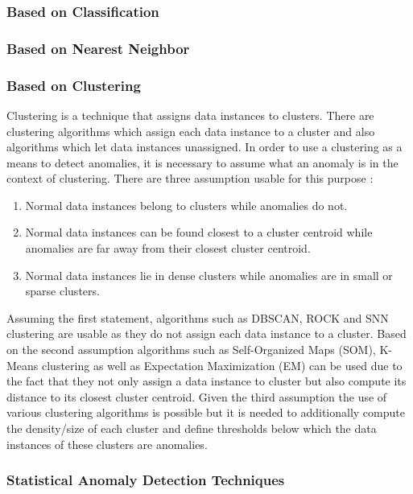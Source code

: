 \documentclass{dima}
\begin{document}
\subsubsection{Based on Classification}

\subsubsection{Based on Nearest Neighbor}

\subsubsection{Based on Clustering}
Clustering is a technique that assigns data instances to clusters. There are clustering algorithms which assign each data instance to a cluster and also algorithms which let data instances unassigned. In order to use a clustering as a means to detect anomalies, it is necessary to assume what an anomaly is in the context of clustering. There are three assumption usable for this purpose \cite{Chandola:2009:ADS:1541880.1541882}:
\begin{enumerate}
\item Normal data instances belong to clusters while anomalies do not.
\item Normal data instances can be found closest to a cluster centroid while anomalies are far away from their closest cluster centroid.
\item Normal data instances lie in dense clusters while anomalies are in small or sparse clusters.
\end{enumerate}
Assuming the first statement, algorithms such as DBSCAN, ROCK and SNN clustering are usable as they do not assign each data instance to a cluster. Based on the second assumption algorithms such as Self-Organized Maps (SOM), K-Means clustering as well as Expectation Maximization (EM) can be used due to the fact that they not only assign a data instance to cluster but also compute its distance to its closest cluster centroid. Given the third assumption the use of various clustering algorithms is possible but it is needed to additionally compute the density/size of each cluster and define thresholds below which the data instances of these clusters are anomalies.

\subsubsection{Statistical Anomaly Detection Techniques}
\end{document}
